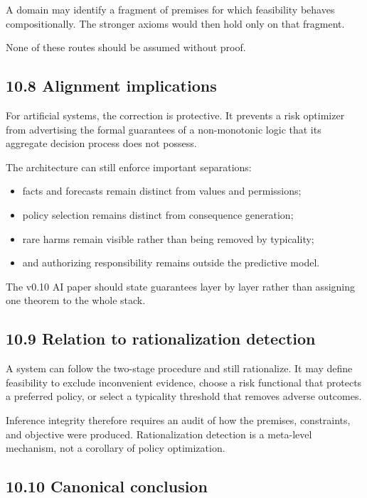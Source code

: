 \documentclass[
  11pt,
]{article}
\providecommand{\tightlist}{%
  \setlength{\itemsep}{0pt}\setlength{\parskip}{0pt}}
\begin{document}
A domain may identify a fragment of premises for which feasibility
behaves compositionally. The stronger axioms would then hold only on
that fragment.

None of these routes should be assumed without proof.

\subsection{10.8 Alignment implications}\label{alignment-implications}

For artificial systems, the correction is protective. It prevents a risk
optimizer from advertising the formal guarantees of a non-monotonic
logic that its aggregate decision process does not possess.

The architecture can still enforce important separations:

\begin{itemize}
\tightlist
\item
  facts and forecasts remain distinct from values and permissions;
\item
  policy selection remains distinct from consequence generation;
\item
  rare harms remain visible rather than being removed by typicality;
\item
  and authorizing responsibility remains outside the predictive model.
\end{itemize}

The v0.10 AI paper should state guarantees layer by layer rather than
assigning one theorem to the whole stack.

\subsection{10.9 Relation to rationalization
detection}\label{relation-to-rationalization-detection}

A system can follow the two-stage procedure and still rationalize. It
may define feasibility to exclude inconvenient evidence, choose a risk
functional that protects a preferred policy, or select a typicality
threshold that removes adverse outcomes.

Inference integrity therefore requires an audit of how the premises,
constraints, and objective were produced. Rationalization detection is a
meta-level mechanism, not a corollary of policy optimization.

\subsection{10.10 Canonical conclusion}\label{canonical-conclusion}
\end{document}
